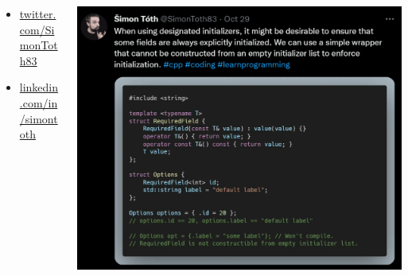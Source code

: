 \documentclass[aspectratio=169]{beamer}
\begin{document}
\begin{frame}{}
\begin{columns}
\begin{column}{0.43\textwidth}
\begin{itemize}
                \item \href{https://twitter.com/SimonToth83}{twitter.com/SimonToth83}
                \item \href{https://www.linkedin.com/in/simontoth}{linkedin.com/in/simontoth}
            \end{itemize}
        \end{column}
    \begin{column}{0.3\textwidth}
        \hspace{-1em}\includegraphics[width=1.08\textwidth]{static/tweet.png}
    \end{column}        
    \end{columns}
\end{frame}
\end{document}
